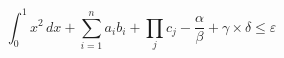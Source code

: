 \begin{equation}
  \int_0^1 x^2 \, dx + \sum_{i=1}^{n} a_i b_i + \prod_{j} c_j - \frac{\alpha}{\beta} + \gamma \times \delta \leq \varepsilon
\end{equation}
